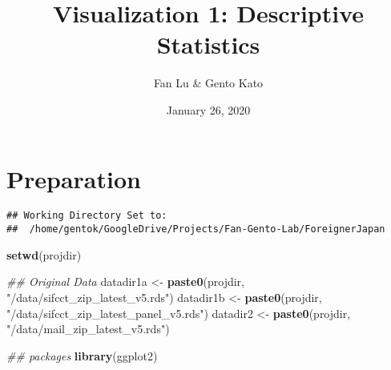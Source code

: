 \documentclass[
]{article}
\title{Visualization 1: Descriptive Statistics}
\author{Fan Lu \& Gento Kato}
\date{January 26, 2020}
\newenvironment{Shaded}{\begin{snugshade}}{\end{snugshade}}
\newcommand{\CharTok}[1]{\textcolor[rgb]{0.31,0.60,0.02}{#1}}
\newcommand{\CommentTok}[1]{\textcolor[rgb]{0.56,0.35,0.01}{\textit{#1}}}
\newcommand{\ControlFlowTok}[1]{\textcolor[rgb]{0.13,0.29,0.53}{\textbf{#1}}}
\newcommand{\DataTypeTok}[1]{\textcolor[rgb]{0.13,0.29,0.53}{#1}}
\newcommand{\KeywordTok}[1]{\textcolor[rgb]{0.13,0.29,0.53}{\textbf{#1}}}
\newcommand{\NormalTok}[1]{#1}
\newcommand{\OperatorTok}[1]{\textcolor[rgb]{0.81,0.36,0.00}{\textbf{#1}}}
\newcommand{\OtherTok}[1]{\textcolor[rgb]{0.56,0.35,0.01}{#1}}
\newcommand{\StringTok}[1]{\textcolor[rgb]{0.31,0.60,0.02}{#1}}
\begin{document}
\maketitle

\hypertarget{preparation}{%
\section{Preparation}\label{preparation}}

\begin{Shaded}
\end{Shaded}

\begin{verbatim}
## Working Directory Set to:
##  /home/gentok/GoogleDrive/Projects/Fan-Gento-Lab/ForeignerJapan
\end{verbatim}

\begin{Shaded}
\begin{Highlighting}[]
\KeywordTok{setwd}\NormalTok{(projdir)}

\CommentTok{## Original Data}
\NormalTok{datadir1a <-}\StringTok{ }\KeywordTok{paste0}\NormalTok{(projdir, }\StringTok{"/data/sifcct_zip_latest_v5.rds"}\NormalTok{)}
\NormalTok{datadir1b <-}\StringTok{ }\KeywordTok{paste0}\NormalTok{(projdir, }\StringTok{"/data/sifcct_zip_latest_panel_v5.rds"}\NormalTok{)}
\NormalTok{datadir2 <-}\StringTok{ }\KeywordTok{paste0}\NormalTok{(projdir, }\StringTok{"/data/mail_zip_latest_v5.rds"}\NormalTok{)}

\CommentTok{## packages}
\KeywordTok{library}\NormalTok{(ggplot2)}
\end{Highlighting}
\end{Shaded}
\end{document}
